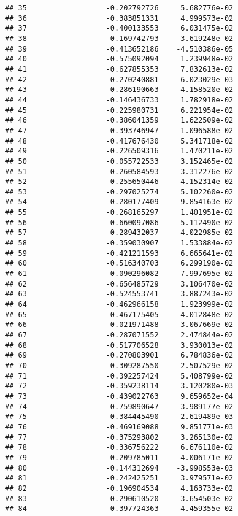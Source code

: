\documentclass[
]{article}
\begin{document}
\begin{verbatim}
## 35                  -0.202792726     5.682776e-02
## 36                  -0.383851331     4.999573e-02
## 37                  -0.400133553     6.031475e-02
## 38                  -0.169742793     3.619248e-02
## 39                  -0.413652186    -4.510386e-05
## 40                  -0.575092094     1.239948e-02
## 41                  -0.627855353     7.832613e-02
## 42                  -0.270240881    -6.023029e-03
## 43                  -0.286190663     4.158520e-02
## 44                  -0.146436733     1.782918e-02
## 45                  -0.225980731     6.221954e-02
## 46                  -0.386041359     1.622509e-02
## 47                  -0.393746947    -1.096588e-02
## 48                  -0.417676430     5.341718e-02
## 49                  -0.226509316     1.470211e-02
## 50                  -0.055722533     3.152465e-02
## 51                  -0.260584593    -3.312276e-02
## 52                  -0.255650446     4.152314e-02
## 53                  -0.297025274     5.102260e-02
## 54                  -0.280177409     9.854163e-02
## 55                  -0.268165297     1.401951e-02
## 56                  -0.660097086     5.112490e-02
## 57                  -0.289432037     4.022985e-02
## 58                  -0.359030907     1.533884e-02
## 59                  -0.421211593     6.665641e-02
## 60                  -0.516340703     6.299190e-02
## 61                  -0.090296082     7.997695e-02
## 62                  -0.656485729     3.106470e-02
## 63                  -0.524553741     3.887243e-02
## 64                  -0.462966158     1.923999e-02
## 65                  -0.467175405     4.012848e-02
## 66                  -0.021971488     3.067669e-02
## 67                  -0.287071552     2.474844e-02
## 68                  -0.517706528     3.930013e-02
## 69                  -0.270803901     6.784836e-02
## 70                  -0.309287550     2.507529e-02
## 71                  -0.392257424     5.408799e-02
## 72                  -0.359238114     3.120280e-03
## 73                  -0.439022763     9.659652e-04
## 74                  -0.759890647     3.989177e-02
## 75                  -0.384445490     2.619489e-03
## 76                  -0.469169088     9.851771e-03
## 77                  -0.375293802     3.265130e-02
## 78                  -0.336756222     6.676110e-02
## 79                  -0.209785011     4.006171e-02
## 80                  -0.144312694    -3.998553e-03
## 81                  -0.242425251     3.979571e-02
## 82                  -0.196904534     4.163733e-02
## 83                  -0.290610520     3.654503e-02
## 84                  -0.397724363     4.459355e-02

\end{verbatim}
\end{document}
